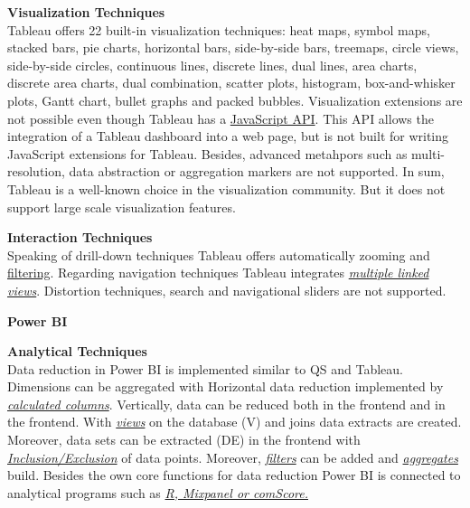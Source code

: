 \textbf{Visualization Techniques}\\
Tableau offers 22 built-in visualization techniques: heat maps, symbol maps, stacked bars, pie charts, horizontal bars, side-by-side bars, treemaps, circle views, side-by-side circles, continuous lines, discrete lines, dual lines, area charts,  discrete area charts, dual combination, scatter plots, histogram, box-and-whisker plots, Gantt chart, bullet graphs and packed bubbles.
Visualization extensions are not possible even though Tableau has a \href{https://www.google.de/search?client=safari&rls=en&q=tableau+javascript+api&ie=UTF-8&oe=UTF-8&gfe_rd=cr&ei=2oLOWKveK5LZ8AeXl4bIBw}{JavaScript API}. This API allows the integration of a Tableau dashboard into a web page, but is not built for writing JavaScript extensions for Tableau. Besides, advanced metahpors such as multi-resolution, data abstraction or aggregation markers are not supported. 
In sum, Tableau is a well-known choice in the visualization community. But it does not support large scale visualization features. 
\par

\textbf{Interaction Techniques}\\
Speaking of drill-down techniques Tableau offers automatically zooming and  \hyperlink{http://kb.tableau.com/articles/howto/adding-filters-to-dashboards}{filtering}.
Regarding navigation techniques Tableau integrates \href{https://www.tableau.com/de-de/whitepapers/enhancing-visual-analysis-linking-multiple-views-data}{\textit{multiple linked views}}.
Distortion techniques, search and navigational sliders are not supported. 
\par

\noindent \textbf{Power BI}
\par
\textbf{Analytical Techniques}\\
Data reduction in Power BI is implemented similar to QS and Tableau. Dimensions can be aggregated with 
Horizontal data reduction implemented by  \href{https://powerbi.microsoft.com/en-us/documentation/powerbi-desktop-tutorial-create-calculated-columns/}{\textit{calculated columns}}. Vertically, data can be reduced both in the frontend and in the frontend. With \href{https://community.powerbi.com/t5/Desktop/How-to-reduce-the-amount-of-data-that-is-loaded-into-my-Power-BI/td-p/54112}{\textit{views}} on the database (V) and joins data extracts are created. Moreover, data sets can be extracted (DE) in the frontend with \href{https://Power BI.microsoft.com/de-de/blog/power-bi-desktop-october-feature-summary/#grouping}{\textit{Inclusion/Exclusion}} of data points. Moreover, \href{https://powerbi.microsoft.com/en-us/documentation/powerbi-service-add-a-filter-to-a-report/}{\textit{filters}} can be added and  \href{https://powerbi.microsoft.com/en-us/documentation/powerbi-service-aggregates/}{\textit{aggregates}} build.
Besides the own core functions for data reduction Power BI is connected to analytical programs such as \href{https://Power BI.microsoft.com/de-de/blog/power-bi-desktop-october-feature-summary/#grouping}{\textit{R, Mixpanel or comScore.}}
\par

